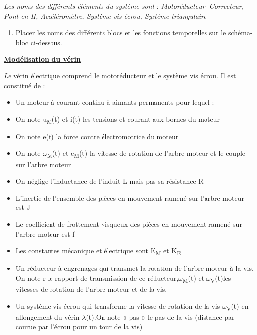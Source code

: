\emph{Les noms des différents éléments du système sont : Motoréducteur,
Correcteur, Pont en H, Accéléromètre, Système vis-écrou, Système
triangulaire}

\begin{enumerate}
\def\labelenumi{\arabic{enumi}.}
\setcounter{enumi}{1}
\item
  Placer les noms des différents blocs et les fonctions temporelles sur
  le schéma-bloc ci-dessous.
\end{enumerate}

\SASchemaFauteuil

\textbf{\ul{Modélisation du vérin}}

\emph{Le} vérin électrique comprend le motoréducteur et le système vis
écrou. Il est constitué de :

\begin{itemize}
\item
  Un moteur à courant continu à aimants permanents pour lequel :
\end{itemize}

\begin{itemize}
\item
  On note u\textsubscript{M}(t) et i(t) les tensions et courant aux
  bornes du moteur
\item
  On note e(t) la force contre électromotrice du moteur
\item
  On note $\omega$\textsubscript{M}(t) et c\textsubscript{M}(t) la vitesse de
  rotation de l'arbre moteur et le couple sur l'arbre moteur
\item
  On néglige l'inductance de l'induit L mais pas sa résistance R
\item
  L'inertie de l'ensemble des pièces en mouvement ramené sur l'arbre
  moteur est J
\item
  Le coefficient de frottement visqueux des pièces en mouvement ramené
  sur l'arbre moteur est f
\item
  Les constantes mécanique et électrique sont K\textsubscript{M} et
  K\textsubscript{E}
\end{itemize}

\begin{itemize}
\item
  Un réducteur à engrenages qui transmet la rotation de l'arbre moteur à
  la vis. On note r le rapport de transmission de ce
  réducteur,$\omega$\textsubscript{M}(t) et $\omega$\textsubscript{V}(t)les vitesses
  de rotation de l'arbre moteur et de la vis.
\item
  Un système vis écrou qui transforme la vitesse de rotation de la vis
  $\omega$\textsubscript{V}(t) en allongement du vérin $\lambda$(t).On note « pas » le
  pas de la vis (distance par courue par l'écrou pour un tour de la vis)
\end{itemize}

